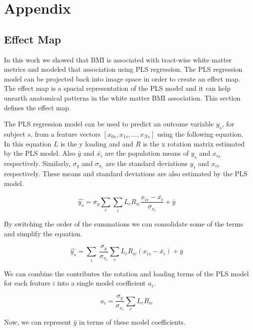 \section{Appendix}
\subsection{Effect Map}

    In this work we showed that BMI is associated with tract-wise white matter metrics and modeled that association using PLS regression. The PLS regression model can be projected back into image space in order to create an effect map. The effect map is a spacial representation of the PLS model and it can help unearth anatomical patterns in the white matter BMI association. This section defines the effect map.

    The PLS regression model can be used to predict an outcome variable $y_s$, for subject $s$, from a feature vectors $[x_{0s}, x_{1s}, ..., x_{Ns}]$ using the following equation. In this equation $L$ is the y loading and and $R$ is the x rotation matrix estimated by the PLS model. Also $\bar{y}$ and $\bar{x_i}$ are the population means of $y_s$ and $x_{is}$ respectively. Similarly, $\sigma_{y}$ and $\sigma_{x_i}$ are the standard deviations $y_s$ and $x_{is}$ respectively. These means and standard deviations are also estimated by the PLS model.
    
\begin{equation} \label{eqn:PlsEqn}
\hat{y_s} = \displaystyle\sigma_y\sum_c\sum_i{L_c R_{ic} \frac{x_{is} - \bar{x_i}}{\sigma_{x_i}}} + \bar{y}
\end{equation}

By switching the order of the summations we can consolidate some of the terms and simplify the equation.

\begin{equation}
\hat{y_s} = \displaystyle\sum_i\ \frac{\sigma_y}{\sigma_{x_i}} \sum_c{ L_c R_{ic} (x_{is} - \bar{x_i})} + \bar{y}
\end{equation}

We can combine the contributes the rotation and loading terms of the PLS model for each feature $i$ into a single model coefficient $a_i$.

\begin{equation}
a_i = \displaystyle\frac{\sigma_y}{\sigma_{x_i}} \sum_c{ L_c R_{ic}}
\end{equation}

Now, we can represent $\hat{y}$ in terms of these model coefficients.

